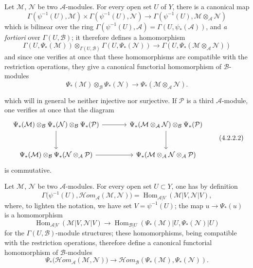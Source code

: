 \begin{env}[4.2.2]
\label{0.4.2.2}
Let $\mathcal{M}$, $\mathcal{N}$ be two $\mathcal{A}$-modules. For every
open set $U$ of $Y$, there is a canonical map
\[
  \Gamma(\psi^{-1}(U),\mathcal{M})
  \times\Gamma(\psi^{-1}(U),\mathcal{N})
  \longrightarrow
  \Gamma(\psi^{-1}(U),\mathcal{M}\otimes_{\mathcal{A}}\mathcal{N})
\]
which is bilinear over the ring
$\Gamma(\psi^{-1}(U),\mathcal{A})=\Gamma(U,\psi_*(\mathcal{A}))$, and
\emph{a fortiori} over $\Gamma(U,\mathcal{B})$; it therefore defines a
homomorphism
\[
  \Gamma(U,\Psi_*(\mathcal{M}))
  \otimes_{\Gamma(U,\mathcal{B})}
  \Gamma(U,\Psi_*(\mathcal{N}))
  \longrightarrow
  \Gamma(U,\Psi_*(\mathcal{M}\otimes_{\mathcal{A}}\mathcal{N}))
\]
and since one verifies at once that these homomorphisms are compatible with
the restriction operations, they give a canonical functorial homomorphism
of $\mathcal{B}$-modules
\[
  \Psi_*(\mathcal{M})\otimes_{\mathcal{B}}\Psi_*(\mathcal{N})
  \longrightarrow
  \Psi_*(\mathcal{M}\otimes_{\mathcal{A}}\mathcal{N}).
  \tag{4.2.2.1}\label{0.4.2.2.1}
\]

which will in general be neither injective nor surjective. If $\mathcal{P}$ is a
third $\mathcal{A}$-module, one verifies at once that the diagram
\[
\begin{tikzcd}[column sep=large,row sep=large]
\Psi_*(\mathcal{M})\otimes_{\mathcal{B}}\Psi_*(\mathcal{N})
  \otimes_{\mathcal{B}}\Psi_*(\mathcal{P})
  \arrow[r]
  \arrow[d]
&
\Psi_*(\mathcal{M}\otimes_{\mathcal{A}}\mathcal{N})
  \otimes_{\mathcal{B}}\Psi_*(\mathcal{P})
  \arrow[d]
\\
\Psi_*(\mathcal{M})\otimes_{\mathcal{B}}
  \Psi_*(\mathcal{N}\otimes_{\mathcal{A}}\mathcal{P})
  \arrow[r]
&
\Psi_*(\mathcal{M}\otimes_{\mathcal{A}}\mathcal{N}
  \otimes_{\mathcal{A}}\mathcal{P})
\end{tikzcd}
\tag{4.2.2.2}\label{0.4.2.2.2}
\]
is commutative.
\end{env}

\begin{env}[4.2.3]
\label{0.4.2.3}
Let $\mathcal{M}$, $\mathcal{N}$ be two $\mathcal{A}$-modules. For every
open set $U\subset Y$, one has by definition
\[
  \Gamma\bigl(\psi^{-1}(U),
    \mathcal{H}\!om_{\mathcal{A}}(\mathcal{M},\mathcal{N})\bigr)
  =
  \operatorname{Hom}_{\mathcal{A}|V}
    (\mathcal{M}|V,\mathcal{N}|V),
\]
where, to lighten the notation, we have set $V=\psi^{-1}(U)$; the map
$u\to\Psi_*(u)$ is a homomorphism
\[
  \operatorname{Hom}_{\mathcal{A}|V}(\mathcal{M}|V,\mathcal{N}|V)
  \longrightarrow
  \operatorname{Hom}_{\mathcal{B}|U}
    (\Psi_*(\mathcal{M})|U,\Psi_*(\mathcal{N})|U)
\]
for the $\Gamma(U,\mathcal{B})$-module structures; these homomorphisms,
being compatible with the restriction operations, therefore define a
canonical functorial homomorphism of $\mathcal{B}$-modules
\[
  \Psi_*\bigl(\mathcal{H}\!om_{\mathcal{A}}(\mathcal{M},\mathcal{N})\bigr)
  \longrightarrow
  \mathcal{H}\!om_{\mathcal{B}}
    (\Psi_*(\mathcal{M}),\Psi_*(\mathcal{N})).
  \tag{4.2.3.1}\label{0.4.2.3.1}
\]
\end{env}


